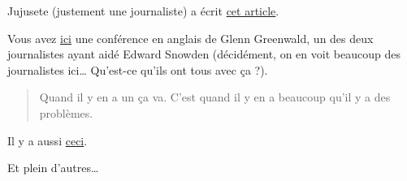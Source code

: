 Jujusete (justement une journaliste) a écrit
\href{http://seteici.ondule.fr/2013/05/emails-sortez-couverts/}{cet article}.

Vous avez
\href{https://www.ted.com/talks/glenn_greenwald_why_privacy_matters}{ici}
une conférence en anglais de Glenn Greenwald, un des deux journalistes
ayant aidé Edward Snowden (décidément, on en voit beaucoup des
journalistes ici\ldots{} Qu'est-ce qu'ils ont tous avec ça ?).

\begin{quote}
Quand il y en a un ça va. C'est quand il y en a beaucoup qu'il y a des
problèmes.
\end{quote}

Il y a aussi \href{http://www.uzine.net/article128.html}{ceci}.

Et plein d'autres\ldots{}
